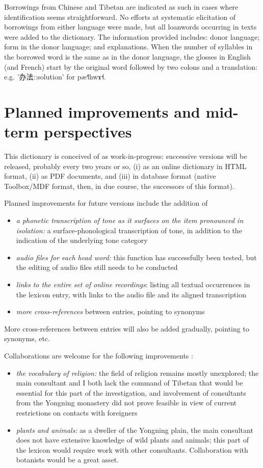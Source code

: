 \documentclass[oldfontcommands,oneside,a4paper,11pt]{article}
\newcommand{\ipa}[1]{{\phon #1}} %
\newcommand{\zh}[1]{{\cn #1}}
\begin{document}
	Borrowings from Chinese and Tibetan are indicated as such in cases where identification seems straightforward. No efforts at systematic elicitation of borrowings from either language were made, but all loanwords occurring in texts were added to the dictionary. The information provided includes: donor language; form in the donor language; and explanations. When the number of syllables in the borrowed word is the same as in the donor language, the glosses in English (and French) start by the original word followed by two colons and a translation: e.g. '\zh{办法}::solution' for \ipa{pæ˧˥hwɤ˧}. 
	
	\section{Planned improvements and mid-term perspectives} \label{sec:improv}
	
	This dictionary is conceived of as work-in-progress: successive versions will be released, probably every two years or so, (i) as an online dictionary in HTML format, (ii) as PDF documents, and (iii) in database format (native Toolbox/MDF format, then, in due course, the successors of this format). 
	
	Planned improvements for future versions include the addition of
	\begin{itemize}
		\item \textit{a phonetic transcription of tone as it surfaces on the item pronounced in isolation:} a surface-phonological transcription of tone, in addition to the indication of the underlying tone category
		\item \textit{audio files for each head word:} this function has successfully been tested, but the editing of audio files still needs to be conducted
		\item \textit{links to the entire set of online recordings}: listing all textual occurrences in the lexicon entry, with links to the audio file and its aligned transcription
		\item \textit{more cross-references} between entries, pointing to synonyms
	\end{itemize}
	
	More cross-references between entries will also be added gradually, pointing to synonyms, etc.
	
	Collaborations are welcome for the following improvements :
	\begin{itemize}
		\item \textit{the vocabulary of religion:} the field of religion remains mostly unexplored; the main consultant and I both lack the command of Tibetan that would be essential for this part of the investigation, and involvement of consultants from the Yongning monastery did not prove feasible in view of current restrictions on contacts with foreigners
		\item \textit{plants and animals:} as a dweller of the Yongning plain, the main consultant does not have extensive knowledge of wild plants and animals; this part of the lexicon would require work with other consultants. Collaboration with botanists would be a great asset.
	\end{itemize}
	
\end{document}
